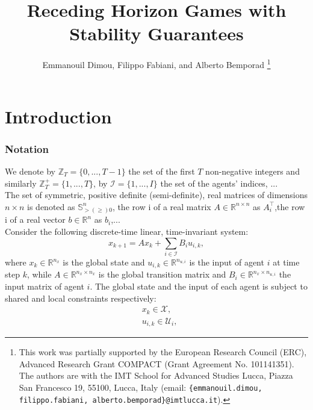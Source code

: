 \documentclass[letterpaper, 10 pt, conference]{ieeeconf}  %
\title{\LARGE \bf
Receding Horizon Games with Stability Guarantees
}
\author{Emmanouil Dimou, Filippo Fabiani, and Alberto Bemporad%
\thanks{This work was partially supported by the European Research Council (ERC), Advanced Research Grant COMPACT (Grant Agreement No. 101141351).
The authors are with the IMT School for Advanced Studies Lucca, Piazza San Francesco 19, 55100, Lucca, Italy (email: {\tt \footnotesize \{emmanouil.dimou, filippo.fabiani, alberto.bemporad\}@imtlucca.it}).}%
}
\newcommand{\R}{\mathbb{R}}
\newcommand{\Z}{\mathbb{Z}}
\newcommand{\bbS}{\mathbb{S}}
\newcommand{\mc}[1]{\mathcal{#1}}
\begin{document}
\maketitle
\thispagestyle{empty}
\pagestyle{empty}
\begin{abstract}

\end{abstract}

\section{Introduction}

\subsubsection*{Notation}
We denote by $\Z_{T} = \{0,...,T-1\}$ the set of the first $T$ non-negative integers and similarly $\Z^{+}_{T} = \{1,...,T\}$, by $\mc{I} = \{1,...,I\}$ the set of the agents' indices, ...\\
The set of symmetric, positive definite (semi-definite), real matrices of dimensions $n \times n$ is denoted as $\bbS^{n}_{> (\geq) 0}$, the row i of a real matrix $A \in \R^{n \times n}$ as $A^{\top}_{i}$,the row i of a real vector $b \in \mathbb{R}^{n}$ as $b_{i}$,...\\
Consider the following discrete-time linear, time-invariant system:
\begin{equation}\label{DT-LTI}
x_{k+1} = A x_{k} + \sum_{i \in \mathcal{I}}B_{i}u_{i,k},
\end{equation}
where $x_{k} \in \R^{n_x}$ is the global state and $u_{i,k} \in \R^{n_{u,i}}$ is the input of agent $i$ at time step $k$, while $A \in \R^{n_x \times n_x}$ is the global transition matrix and $B_{i} \in \R^{n_x \times n_{u,i}}$ the input matrix of agent $i$. The global state and the input of each agent is  subject to shared and local constraints respectively:
\begin{subequations}\label{State,Input constraints}
\begin{align}
&x_{k} \in \mc{X},\\
&u_{i,k} \in \mc{U}_{i},
\end{align}
\end{subequations}
\end{document}
